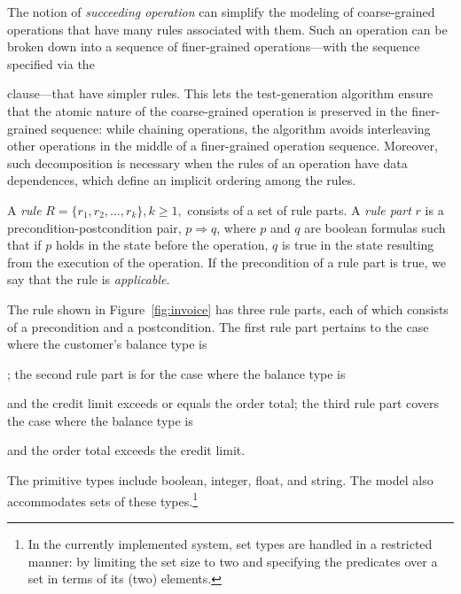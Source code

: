 The notion of \textit{succeeding operation} can simplify the modeling of
coarse-grained operations that have many rules associated with them. Such an
operation can be broken down into a sequence of finer-grained operations---with
the sequence specified via the \subject{next} clause---that have simpler
rules. This lets the test-generation algorithm ensure that the atomic nature of
the coarse-grained operation is preserved in the finer-grained sequence: while
chaining operations, the algorithm avoids interleaving other operations in the
middle of a finer-grained operation sequence.  Moreover, such decomposition is
necessary when the rules of an operation have data dependences, which define an
implicit ordering among the rules. %

A \textit{rule} $R = \{r_1, r_2, \ldots, r_k\}, k \geq 1,$ consists of a set of
rule parts. A \textit{rule part} $r$ is a precondition-postcondition pair, $p
\Longrightarrow q$, where $p$ and $q$ are boolean formulas such that if $p$
holds in the state before the operation, $q$ is true in the state resulting from
the execution of the operation. If the precondition of a rule part is true, we
say that the rule is \textit{applicable}.

The rule shown in Figure~\ref{fig:invoice} has three rule parts, each of which
consists of a precondition and a postcondition. The first rule part pertains to
the case where the customer's balance type is \subject{None}; the second rule
part is for the case where the balance type is \subject{Credit} and the credit
limit exceeds or equals the order total; the third rule part covers the case
where the balance type is \subject{Credit} and the order total exceeds the
credit limit.


The primitive types include boolean, integer, float, and string. The model also
accommodates sets of these types.\footnote{In the currently implemented system,
  set types are handled in a restricted manner: by limiting the set size to two
  and specifying the predicates over a set in terms of its (two) elements.}

